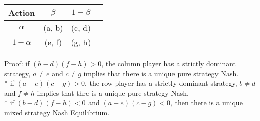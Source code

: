 \documentclass{article}
\begin{document}
\begin{center} \begin{tabular}{|c|c|c|c|}
\hline
 Action &$\beta$ &$1 - \beta$\\ \hline
$\alpha$ &(a, b) &(c, d)\\ \hline
$1 - \alpha$ &(e, f) &(g, h)\\ \hline
\end{tabular} \end{center}
Proof: if $\left(b  - d\right)\left(f - h\right) > 0$, the column player has a strictly dominant strategy, $a  \neq  e $ and $c  \neq  g $ implies that there is a unique pure strategy Nash.
\\* if $\left(a  - e\right)\left(c - g\right) > 0$, the row player has a strictly dominant strategy, $b  \neq  d $ and $f  \neq  h $ implies that thre is a unique pure strategy Nash.
\\* if $\left(b  - d\right)\left(f - h\right) < 0$ and $\left(a  - e\right)\left(c - g\right) < 0$, then there is a unique mixed strategy Nash Equilibrium.
\newline \newline
\end{document}
